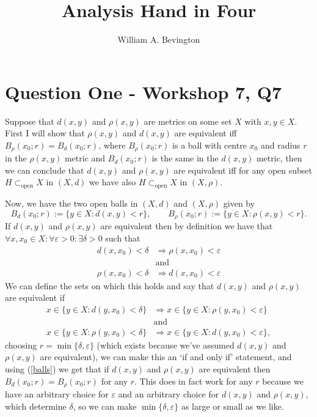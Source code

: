 \documentclass{article}
\author{William A. Bevington}
\title{Analysis Hand in Four}
\date{}
\begin{document}
\maketitle
\section*{Question One - Workshop 7, Q7}
Suppose that $d(x,y)$ and $\rho(x,y)$ are metrics on some set $X$ with $x,y\in X$. First I will show that $\rho(x,y)$ and $d(x,y)$ are equivalent iff $B_\rho(x_0;r) = B_d(x_0;r)$, where $B_\rho(x_0;r)$ is a ball with centre $x_0$ and radius $r$ in the $\rho(x,y)$ metric and $B_d(x_0;r)$ is the same in the $d(x,y)$ metric, then we can conclude that $d(x,y)$ and $\rho(x,y)$ are equivalent iff for any open subset $H\subset_\text{open} X$ in $(X,d)$ we have also $H\subset_\text{open} X$ in $(X,\rho)$. 

Now, we have the two open balls in $(X,d)$ and $(X,\rho)$ given by
	\begin{equation}\label{balls}
		B_d(x_0;r)    := \{y\in X : d(x,y)<r \}, \quad \quad
		B_\rho(x_0;r) := \{y\in X : \rho(x,y)<r \}.
	\end{equation}
If $d(x,y)$ and $\rho(x,y)$ are equivalent then by definition we have that $\forall x,x_0\in X: \forall\varepsilon>0: \exists\delta>0$ such that  
	\begin{align*}
		d(x,x_0)<\delta &\Rightarrow \rho(x,x_0)<\varepsilon \\
		&\text{and} \\
		\rho(x,x_0)<\delta &\Rightarrow d(x,x_0)<\varepsilon
	\end{align*}		
We can define the sets on which this holds and say that $d(x,y)$ and $\rho(x,y)$ are equivalent if
	\begin{align*}
		x\in\{y\in X: d(y,x_0)<\delta\}&\Rightarrow x\in\{y\in X: \rho(y,x_0)<\varepsilon\} \\
		&\text{and} \\
		x\in\{y\in X: \rho(y,x_0)<\delta\}&\Rightarrow x\in\{y\in X: d(y,x_0)<\varepsilon\},
	\end{align*}
choosing $r=\min\{\delta,\varepsilon\}$ (which exists because we've assumed $d(x,y)$ and $\rho(x,y)$ are equivalent), we can make this an `if and only if' statement, and using (\ref{balls}) we get that if $d(x,y)$ and $\rho(x,y)$ are equivalent then $B_d(x_0;r) = B_\rho(x_0;r)$ for any $r$. This does in fact work for any $r$ because we have an arbitrary choice for $\varepsilon$ and an arbitrary choice for $d(x,y)$ and $\rho(x,y)$, which determine $\delta$, so we can make $\min\{\delta,\varepsilon\}$ as large or small as we like.
\end{document}
